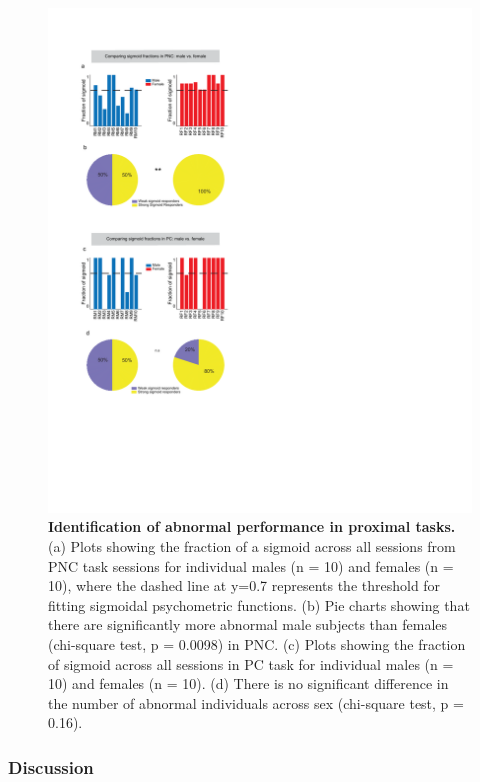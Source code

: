 \documentclass{article}
\begin{document}
\begin{figure}[H]
  \centering
  \includegraphics[width=\textwidth, trim=50 100 50 100]{Figs/Alcohol_main_6.pdf}
  \caption{\textbf{Identification of abnormal performance in proximal tasks.} (a) Plots showing the fraction of a sigmoid across all sessions from PNC task sessions for individual males (n = 10) and females (n = 10), where the dashed line at y=0.7 represents the threshold for fitting sigmoidal psychometric functions. (b) Pie charts showing that there are significantly more abnormal male subjects than females (chi-square test, p = 0.0098) in PNC. (c) Plots showing the fraction of sigmoid across all sessions in PC task for individual males (n = 10) and females (n = 10). (d) There is no significant difference in the number of abnormal individuals across sex (chi-square test, p = 0.16).}
  \label{fig:alcohol_main_6}
\end{figure}

\clearpage

\subsubsection{Discussion}
\end{document}
